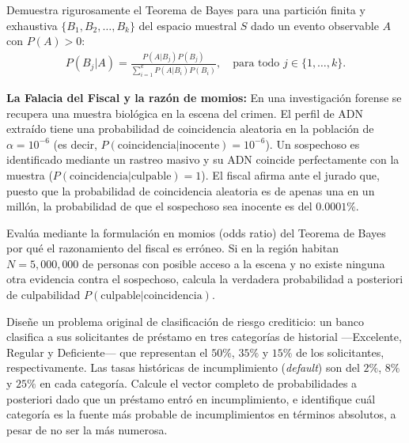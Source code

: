 \begin{problema}
	\label{prob:a7e87e4}
	Demuestra rigurosamente el Teorema de Bayes para una partición finita y exhaustiva $\{B_1, B_2, \dots, B_k\}$ del espacio muestral $S$ dado un evento observable $A$ con $P(A)>0$:
	\begin{align}
		P(B_j | A) = \frac{P(A|B_j)P(B_j)}{\sum_{i=1}^k P(A|B_i)P(B_i)}, \quad \text{para todo } j \in \{1, \dots, k\}.
	\end{align}
\end{problema}

\begin{problema}
	\label{prob:898898e}
	\textbf{La Falacia del Fiscal y la razón de momios:} En una investigación forense se recupera una muestra biológica en la escena del crimen. El perfil de ADN extraído tiene una probabilidad de coincidencia aleatoria en la población de $\alpha = 10^{-6}$ (es decir, $P(\text{coincidencia} | \text{inocente}) = 10^{-6}$). Un sospechoso es identificado mediante un rastreo masivo y su ADN coincide perfectamente con la muestra ($P(\text{coincidencia} | \text{culpable}) = 1$). El fiscal afirma ante el jurado que, puesto que la probabilidad de coincidencia aleatoria es de apenas una en un millón, la probabilidad de que el sospechoso sea inocente es del $0.0001\%$.

	Evalúa mediante la formulación en momios (odds ratio) del Teorema de Bayes por qué el razonamiento del fiscal es erróneo. Si en la región habitan $N = 5,000,000$ de personas con posible acceso a la escena y no existe ninguna otra evidencia contra el sospechoso, calcula la verdadera probabilidad a posteriori de culpabilidad $P(\text{culpable} | \text{coincidencia})$.
\end{problema}

\begin{problema}
	\label{prob:3bf9f42}
	Diseñe un problema original de clasificación de riesgo crediticio: un banco clasifica a sus solicitantes de préstamo en tres categorías de historial —Excelente, Regular y Deficiente— que representan el $50\%$, $35\%$ y $15\%$ de los solicitantes, respectivamente. Las tasas históricas de incumplimiento (\emph{default}) son del $2\%$, $8\%$ y $25\%$ en cada categoría. Calcule el vector completo de probabilidades a posteriori dado que un préstamo entró en incumplimiento, e identifique cuál categoría es la fuente más probable de incumplimientos en términos absolutos, a pesar de no ser la más numerosa.
\end{problema}

